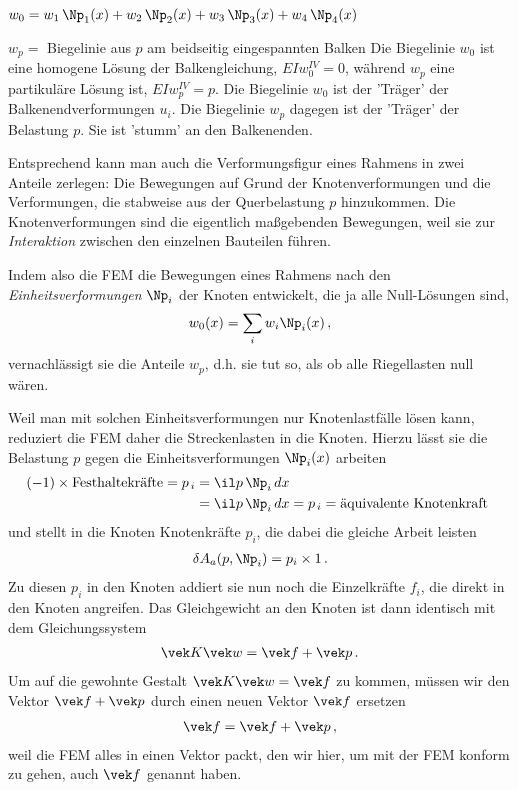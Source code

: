 {{\bite
\item{$w_0 = w_1 \,\Np_1(x) + w_2 \,\Np_2(x) + w_3 \,\Np_3(x) + w_4 \,\Np_4(x)$ }
\item{$w_p = $ Biegelinie aus $p$ am beidseitig eingespannten Balken}
\eite
Die Biegelinie $w_0$ ist eine homogene L\"{o}sung der Balkengleichung,
$EI w^{IV}_0 = 0$, w\"{a}hrend $w_p$ eine partikul\"{a}re L\"{o}sung ist, $EI w^{IV}_p = p$. Die
Biegelinie $w_0$ ist der 'Tr\"{a}ger' der Balkenendverformungen $u_i$. Die
Biegelinie $w_p$ dagegen ist der 'Tr\"{a}ger' der Belastung $p$. Sie ist 'stumm' an den Balkenenden.

Entsprechend kann man auch die Verformungsfigur eines Rahmens in zwei Anteile zerlegen:
Die Bewegungen auf Grund der Knotenverformungen und die
Verformungen, die stabweise aus der Querbelastung $p$ hinzukommen. Die
Knotenverformungen sind die eigentlich ma{\ss}gebenden Bewegungen, weil sie zur {\em
Interaktion} zwischen den einzelnen Bauteilen f\"{u}hren.

Indem also die FEM die Bewegungen eines Rahmens nach den {\em Einheitsverformungen}
$\Np_i$ der Knoten entwickelt, die ja alle Null-L\"{o}sungen sind,
\begin{align}
w_0(x) = \sum_i w_i \Np_i(x)\,,
\end{align}
vernachl\"{a}ssigt sie die Anteile $w_p$, d.h. sie tut so, als ob alle Riegellasten null
w\"{a}ren.

Weil man mit solchen Einheitsverformungen nur Knotenlastf\"{a}lle l\"{o}sen kann, reduziert die
FEM daher die Streckenlasten in die Knoten. Hierzu l\"{a}sst sie die Belastung $p$ gegen die
Einheitsverformungen $\Np_i(x)$ arbeiten
\begin{align}
\!\!(-1) \times \mbox{Festhaltekr\"{a}fte} = p_{\,i} &= \il p \, \Np_i \, dx\\
 &= \il p
\,\Np_i\, dx = p_{\,i} = \mbox{\"{a}quivalente Knotenkraft}
\end{align}
und stellt in die Knoten Knotenkr\"{a}fte
$p_i$, die dabei die gleiche Arbeit leisten
\begin{align}
\delta A_a(p,\Np_i) =  p_i \times 1 \,.
\end{align}
Zu diesen $p_i$ in den Knoten addiert sie nun noch die Einzelkr\"{a}fte $f_i$, die direkt in den Knoten angreifen. Das Gleichgewicht an den Knoten ist dann identisch mit dem Gleichungssystem
\begin{align}\label{System10}
\vek K \vek w = \vek f + \vek p\,.
\end{align}
Um auf die gewohnte Gestalt $\vek K \vek w = \vek f$ zu kommen, m\"{u}ssen wir den Vektor $\vek f + \vek p$ durch einen neuen Vektor $\vek f$ ersetzen
\begin{align}
\vek f = \vek f + \vek p\,,
\end{align}
weil die FEM alles in einen Vektor packt, den wir hier, um mit der FEM konform zu gehen, auch $\vek f$ genannt haben.

}}
